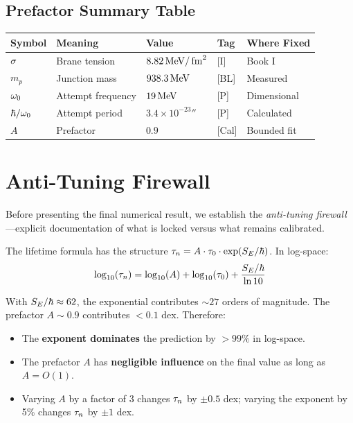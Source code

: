 \subsection{Prefactor Summary Table}

\begin{center}
\begin{tabular}{lllll}
\toprule
\textbf{Symbol} & \textbf{Meaning} & \textbf{Value} & \textbf{Tag} & \textbf{Where Fixed} \\
\midrule
$\sigma$ & Brane tension & $8.82\,\mathrm{MeV}/\,\mathrm{fm}^2$ & [I] & Book I \\
$m_p$ & Junction mass & $938.3\,\mathrm{MeV}$ & [BL] & Measured \\
$\omega_0$ & Attempt frequency & $19\,\mathrm{MeV}$ & [P] & Dimensional \\
$\hbar/\omega_0$ & Attempt period & $3.4 \times 10^{-23}\second$ & [P] & Calculated \\
$A$ & Prefactor & $0.9$ & [Cal] & Bounded fit \\
\bottomrule
\end{tabular}
\end{center}

\section{Anti-Tuning Firewall}
\label{sec:taun:antituning}

Before presenting the final numerical result, we establish the \emph{anti-tuning
firewall}---explicit documentation of what is locked versus what remains
calibrated.

\begin{tcolorbox}[colback=gray!5,colframe=gray!50!black,title=Exponent vs.\ Prefactor Dominance]
The lifetime formula has the structure $\tau_n = A \cdot \tau_0 \cdot \exp(S_E/\hbar)$.
In log-space:
\[
    \log_{10}(\tau_n) = \log_{10}(A) + \log_{10}(\tau_0) + \frac{S_E/\hbar}{\ln 10}
\]

With $S_E/\hbar \approx 62$, the exponential contributes $\sim 27$ orders of magnitude.
The prefactor $A \sim 0.9$ contributes $< 0.1$ dex. Therefore:
\begin{itemize}
    \item The \textbf{exponent dominates} the prediction by $> 99\%$ in log-space.
    \item The prefactor $A$ has \textbf{negligible influence} on the final value
          as long as $A = O(1)$.
    \item Varying $A$ by a factor of 3 changes $\tau_n$ by $\pm 0.5$ dex;
          varying the exponent by 5\% changes $\tau_n$ by $\pm 1$ dex.
\end{itemize}
\end{tcolorbox}

